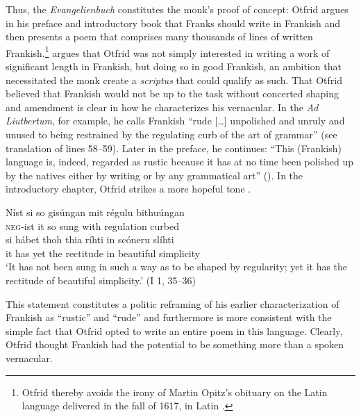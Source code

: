 Thus, the \textit{Evangelienbuch} constitutes the monk’s proof of concept: Otfrid argues in his preface and introductory book that Franks should write in Frankish and then presents a poem that comprises many thousands of lines of written Frankish.\footnote{\textrm{Otfrid thereby avoids the irony of Martin Opitz’s obituary on the Latin language delivered in the fall of 1617, in Latin \citep[142]{Krebs2011}.} } \citet[31; 37--38]{Somers2021b} argues that Otfrid was not simply interested in writing a work of significant length in Frankish, but doing so in good Frankish, an ambition that necessitated the monk create a \textit{scriptus} that could qualify as such. That Otfrid believed that Frankish would not be up to the task without concerted shaping and amendment is clear in how he characterizes his vernacular. In the \textit{Ad Liutbertum}, for example, he calls Frankish “rude […] unpolished and unruly and unused to being restrained by the regulating curb of the art of grammar” (see  translation of lines 58--59). Later in the preface, he continues: “This (Frankish) language is, indeed, regarded as rustic because it has at no time been polished up by the natives either by writing or by any grammatical art” (\citealt[886]{Magoun1943}). In the introductory chapter, Otfrid strikes a more hopeful tone .

\ea%
    \label{ex:5:2}
\gll Níst   si   so  gisúngan       mit    régulu    bithuúngan\\
  \textsc{neg}{}-ist  it  so  sung    with  regulation  curbed\\

\gll si  hábet  thoh  thia  ríhti        in  scóneru    slíhti\\
it   has     yet    the  rectitude   in  beautiful  simplicity\\

\glt ‘It has not been sung in such a way as to be shaped by regularity; yet it has the rectitude of beautiful simplicity.’ (I 1, 35--36)
  \z

\noindent This statement constitutes a politic reframing of his earlier characterization of Frankish as “rustic” and “rude” and furthermore is more consistent with the simple fact that Otfrid opted to write an entire poem in this language. Clearly, Otfrid thought Frankish had the potential to be something more than a spoken vernacular.

